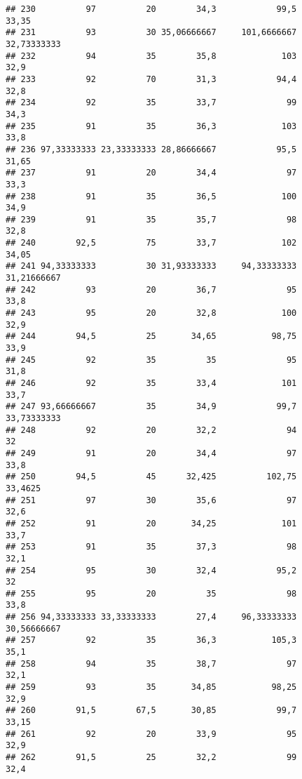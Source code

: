 \documentclass[
]{article}
\begin{document}
\begin{verbatim}
## 230          97          20        34,3            99,5                33,35
## 231          93          30 35,06666667     101,6666667          32,73333333
## 232          94          35        35,8             103                 32,9
## 233          92          70        31,3            94,4                 32,8
## 234          92          35        33,7              99                 34,3
## 235          91          35        36,3             103                 33,8
## 236 97,33333333 23,33333333 28,86666667            95,5                31,65
## 237          91          20        34,4              97                 33,3
## 238          91          35        36,5             100                 34,9
## 239          91          35        35,7              98                 32,8
## 240        92,5          75        33,7             102                34,05
## 241 94,33333333          30 31,93333333     94,33333333          31,21666667
## 242          93          20        36,7              95                 33,8
## 243          95          20        32,8             100                 32,9
## 244        94,5          25       34,65           98,75                 33,9
## 245          92          35          35              95                 31,8
## 246          92          35        33,4             101                 33,7
## 247 93,66666667          35        34,9            99,7          33,73333333
## 248          92          20        32,2              94                   32
## 249          91          20        34,4              97                 33,8
## 250        94,5          45      32,425          102,75              33,4625
## 251          97          30        35,6              97                 32,6
## 252          91          20       34,25             101                 33,7
## 253          91          35        37,3              98                 32,1
## 254          95          30        32,4            95,2                   32
## 255          95          20          35              98                 33,8
## 256 94,33333333 33,33333333        27,4     96,33333333          30,56666667
## 257          92          35        36,3           105,3                 35,1
## 258          94          35        38,7              97                 32,1
## 259          93          35       34,85           98,25                 32,9
## 260        91,5        67,5       30,85            99,7                33,15
## 261          92          20        33,9              95                 32,9
## 262        91,5          25        32,2              99                 32,4

\end{verbatim}
\end{document}
